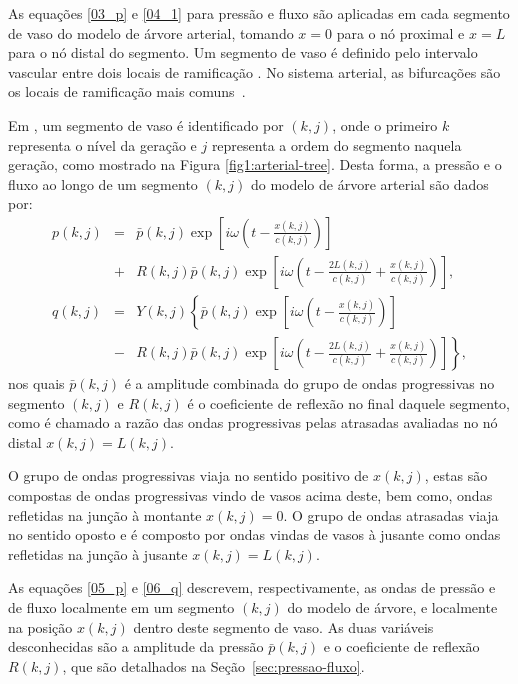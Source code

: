 \documentclass[a4paper,12pt]{monografia}
\theoremstyle{plain}
\theoremstyle{definition}
\theoremstyle{remark}
\begin{document}
As equações \eqref{03_p} e \eqref{04_1} para pressão e fluxo são aplicadas em cada segmento de vaso do modelo de árvore arterial, tomando $x = 0$ para o nó proximal e $x = L$ para o nó distal do segmento. Um segmento de vaso é definido pelo intervalo vascular entre dois locais de ramificação \cite{Zamir3}. No sistema arterial, as bifurcações são os locais de ramificação mais comuns~\cite{Zamir1}.

Em \cite{Duan}, um segmento de vaso é identificado por $(k,j)$, onde o primeiro $k$ representa o nível da geração e $j$ representa a ordem do segmento naquela geração, como mostrado na Figura \ref{fig1:arterial-tree}. Desta forma, a pressão e o fluxo ao longo de um segmento  $(k,j)$ do modelo de árvore arterial são dados por:
\begin{eqnarray}
	p(k,j) &=& \bar{p}(k,j) \exp\left[i\omega\left(t - \frac{x(k,j)}{c(k,j)}\right)\right] \nonumber \\
	&+& R(k,j)  \bar{p}(k,j) \exp\left[i\omega\left(t - \frac{2L(k,j)}{c(k,j)} + \frac{x(k,j)}{c(k,j)}\right)\right],
	\label{05_p}\\
	q (k,j) &=& Y(k,j)\left\{\bar{p}(k,j) \exp\left[i\omega\left(t - \frac{x(k,j)}{c(k,j)}\right)\right]\right. \nonumber \\
	&-& \left. R(k,j)  \bar{p}(k,j) \exp\left[i\omega\left(t - \frac{2L(k,j)}{c(k,j)} + \frac{x(k,j)}{c(k,j)}\right)\right]\right\},
	\label{06_q}
\end{eqnarray}
nos quais $\bar{p}(k,j)$ é a amplitude combinada do grupo de ondas progressivas no segmento $(k,j)$ e $R(k,j)$ é o coeficiente de reflexão no final daquele segmento, como é chamado a razão das ondas progressivas pelas atrasadas avaliadas no nó distal $x(k,j) = L(k,j)$. 

O grupo de ondas progressivas viaja no sentido positivo de $x(k,j)$, estas são compostas de ondas progressivas vindo de vasos acima deste, bem como, ondas refletidas na junção à montante $x(k,j) = 0$. O grupo de ondas atrasadas viaja no sentido oposto e é composto por ondas vindas de vasos à jusante como ondas refletidas na junção à jusante $x(k,j) = L(k,j)$. 

As equações \eqref{05_p} e \eqref{06_q} descrevem, respectivamente, as ondas de pressão e de fluxo localmente em um segmento $(k,j)$ do modelo de árvore, e localmente na posição $x(k,j)$ dentro deste segmento de vaso. As duas variáveis desconhecidas são a amplitude da pressão  $\bar{p} (k,j)$ e o coeficiente de reflexão $R (k,j)$, que são detalhados na Seção~\ref{sec:pressao-fluxo}. 
\end{document}
